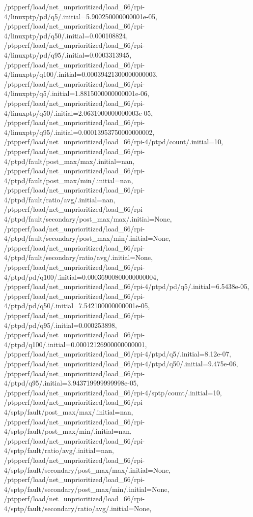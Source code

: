 {    /ptpperf/load/net_unprioritized/load_66/rpi-4/linuxptp/pd/q5/.initial=5.900250000000001e-05,
    /ptpperf/load/net_unprioritized/load_66/rpi-4/linuxptp/pd/q50/.initial=0.000108824,
    /ptpperf/load/net_unprioritized/load_66/rpi-4/linuxptp/pd/q95/.initial=0.0003313945,
    /ptpperf/load/net_unprioritized/load_66/rpi-4/linuxptp/q100/.initial=0.00039421300000000003,
    /ptpperf/load/net_unprioritized/load_66/rpi-4/linuxptp/q5/.initial=1.8815000000000001e-06,
    /ptpperf/load/net_unprioritized/load_66/rpi-4/linuxptp/q50/.initial=2.0631000000000003e-05,
    /ptpperf/load/net_unprioritized/load_66/rpi-4/linuxptp/q95/.initial=0.00013953750000000002,
    /ptpperf/load/net_unprioritized/load_66/rpi-4/ptpd/count/.initial=10,
    /ptpperf/load/net_unprioritized/load_66/rpi-4/ptpd/fault/post_max/max/.initial=nan,
    /ptpperf/load/net_unprioritized/load_66/rpi-4/ptpd/fault/post_max/min/.initial=nan,
    /ptpperf/load/net_unprioritized/load_66/rpi-4/ptpd/fault/ratio/avg/.initial=nan,
    /ptpperf/load/net_unprioritized/load_66/rpi-4/ptpd/fault/secondary/post_max/max/.initial=None,
    /ptpperf/load/net_unprioritized/load_66/rpi-4/ptpd/fault/secondary/post_max/min/.initial=None,
    /ptpperf/load/net_unprioritized/load_66/rpi-4/ptpd/fault/secondary/ratio/avg/.initial=None,
    /ptpperf/load/net_unprioritized/load_66/rpi-4/ptpd/pd/q100/.initial=0.00036900800000000004,
    /ptpperf/load/net_unprioritized/load_66/rpi-4/ptpd/pd/q5/.initial=6.5438e-05,
    /ptpperf/load/net_unprioritized/load_66/rpi-4/ptpd/pd/q50/.initial=7.542100000000001e-05,
    /ptpperf/load/net_unprioritized/load_66/rpi-4/ptpd/pd/q95/.initial=0.000253898,
    /ptpperf/load/net_unprioritized/load_66/rpi-4/ptpd/q100/.initial=0.00012126900000000001,
    /ptpperf/load/net_unprioritized/load_66/rpi-4/ptpd/q5/.initial=8.12e-07,
    /ptpperf/load/net_unprioritized/load_66/rpi-4/ptpd/q50/.initial=9.475e-06,
    /ptpperf/load/net_unprioritized/load_66/rpi-4/ptpd/q95/.initial=3.943719999999998e-05,
    /ptpperf/load/net_unprioritized/load_66/rpi-4/sptp/count/.initial=10,
    /ptpperf/load/net_unprioritized/load_66/rpi-4/sptp/fault/post_max/max/.initial=nan,
    /ptpperf/load/net_unprioritized/load_66/rpi-4/sptp/fault/post_max/min/.initial=nan,
    /ptpperf/load/net_unprioritized/load_66/rpi-4/sptp/fault/ratio/avg/.initial=nan,
    /ptpperf/load/net_unprioritized/load_66/rpi-4/sptp/fault/secondary/post_max/max/.initial=None,
    /ptpperf/load/net_unprioritized/load_66/rpi-4/sptp/fault/secondary/post_max/min/.initial=None,
    /ptpperf/load/net_unprioritized/load_66/rpi-4/sptp/fault/secondary/ratio/avg/.initial=None,
}
